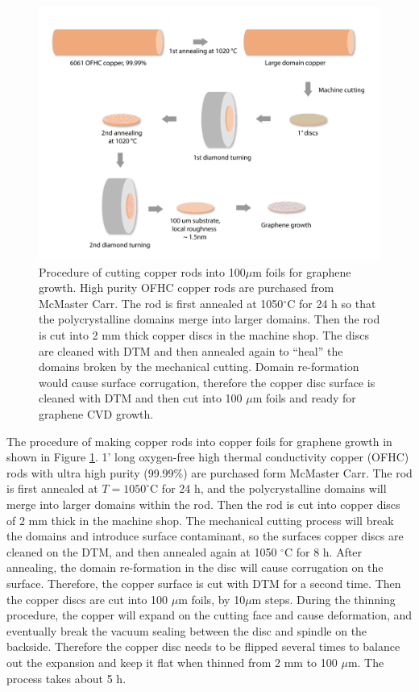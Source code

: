 \documentclass[pdflatex, sectionletters, 12pt]{pittetd}    %
\begin{document}
\begin{figure}[p]
	\centering
	\includegraphics[width=1\textwidth]{Drawing/CopperProcessing.pdf}
	\caption{Procedure of cutting copper rods into 100$\mu$m foils for graphene growth. High purity OFHC copper rods are purchased from McMaster Carr. The rod is first annealed at 1050$^{\circ}$C for 24 h so that the polycrystalline domains merge into larger domains. Then the rod is cut into 2 mm thick copper discs in the machine shop. The discs are cleaned with DTM and then annealed again to ``heal'' the domains broken by the mechanical cutting. Domain re-formation would cause surface corrugation, therefore the copper disc surface is cleaned with DTM and then cut into 100 $\mu$m foils and ready for graphene CVD growth. }
	\label{FIG:CopperProcessing}
\end{figure}

The procedure of making copper rods into copper foils for graphene growth in shown in Figure \ref{FIG:CopperProcessing}. 1' long oxygen-free high thermal conductivity copper (OFHC) rods with ultra high purity (99.99\%) are purchased form McMaster Carr. The rod is first annealed at $T=1050^{\circ}$C for 24 h, and the polycrystalline domains will merge into larger domains within the rod. Then the rod is cut into copper discs of 2 mm thick in the machine shop. The mechanical cutting process will break the domains and introduce surface contaminant, so the surfaces copper discs are cleaned on the DTM, and then annealed again at 1050 $^{\circ}$C for 8 h. After annealing, the domain re-formation in the disc will cause corrugation on the surface. Therefore, the copper surface is cut with DTM for a second time. Then the copper discs are cut into 100 $\mu$m foils, by 10$\mu$m steps. During the thinning procedure, the copper will expand on the cutting face and cause deformation, and eventually break the vacuum sealing between the disc and spindle on the backside. Therefore the copper disc needs to be flipped several times to balance out the expansion and keep it flat when thinned from 2 mm to 100 $\mu$m. The process takes about 5 h. 
\end{document}

